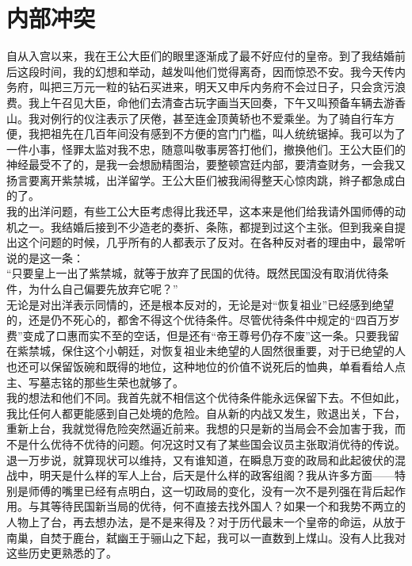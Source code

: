 \fancyhead[RO]{} %
\fancyhead[LE]{} %
\chapter*{内部冲突}
\thispagestyle{empty}
自从入宫以来，我在王公大臣们的眼里逐渐成了最不好应付的皇帝。到了我结婚前后这段时间，我的幻想和举动，越发叫他们觉得离奇，因而惊恐不安。我今天传内务府，叫把三万元一粒的钻石买进来，明天又申斥内务府不会过日子，只会贪污浪费。我上午召见大臣，命他们去清查古玩字画当天回奏，下午又叫预备车辆去游香山。我对例行的仪注表示了厌倦，甚至连金顶黄轿也不爱乘坐。为了骑自行车方便，我把祖先在几百年间没有感到不方便的宫门门槛，叫人统统锯掉。我可以为了一件小事，怪罪太监对我不忠，随意叫敬事房答打他们，撤换他们。王公大臣们的神经最受不了的，是我一会想励精图治，要整顿宫廷内部，要清查财务，一会我又扬言要离开紫禁城，出洋留学。王公大臣们被我闹得整天心惊肉跳，辫子都急成白的了。\\

我的出洋问题，有些工公大臣考虑得比我还早，这本来是他们给我请外国师傅的动机之一。我结婚后接到不少造老的奏折、条陈，都提到过这个主张。但到我亲自提出这个问题的时候，几乎所有的人都表示了反对。在各种反对者的理由中，最常听说的是这一条：\\

“只要皇上一出了紫禁城，就等于放弃了民国的优待。既然民国没有取消优待条件，为什么自己偏要先放弃它呢？”\\

无论是对出洋表示同情的，还是根本反对的，无论是对“恢复祖业”已经感到绝望的，还是仍不死心的，都舍不得这个优待条件。尽管优待条件中规定的“四百万岁费”变成了口惠而实不至的空话，但是还有“帝王尊号仍存不废”这一条。只要我留在紫禁城，保住这个小朝廷，对恢复祖业未绝望的人固然很重要，对于已绝望的人也还可以保留饭碗和既得的地位，这种地位的价值不说死后的恤典，单看看给人点主、写墓志铭的那些生荣也就够了。\\

我的想法和他们不同。我首先就不相信这个优待条件能永远保留下去。不但如此，我比任何人都更能感到自己处境的危险。自从新的内战又发生，败退出关，下台，重新上台，我就觉得危险突然逼近前来。我想的只是新的当局会不会加害于我，而不是什么优待不优待的问题。何况这时又有了某些国会议员主张取消优待的传说。退一万步说，就算现状可以维持，又有谁知道，在瞬息万变的政局和此起彼伏的混战中，明天是什么样的军人上台，后天是什么样的政客组阁？我从许多方面——特别是师傅的嘴里已经有点明白，这一切政局的变化，没有一次不是列强在背后起作用。与其等待民国新当局的优待，何不直接去找外国人？如果一个和我势不两立的人物上了台，再去想办法，是不是来得及？对于历代最末一个皇帝的命运，从放于南巢，自焚于鹿台，弑幽王于骊山之下起，我可以一直数到上煤山。没有人比我对这些历史更熟悉的了。\\

